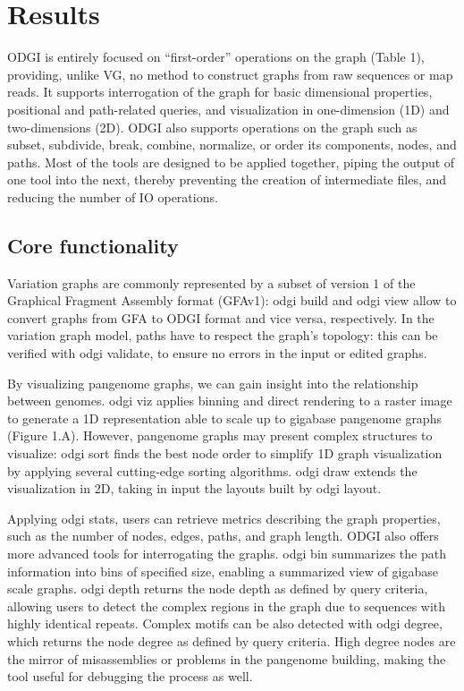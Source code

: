 \documentclass{bioinfo}
\begin{document}
\section{Results}

ODGI is entirely focused on “first-order” operations on the graph (Table 1), providing, unlike VG, no method to construct graphs from raw sequences or map reads. It supports interrogation of the graph for basic dimensional properties, positional and path-related queries, and visualization in one-dimension (1D) and two-dimensions (2D). ODGI also supports operations on the graph such as subset, subdivide, break, combine, normalize, or order its components, nodes, and paths. Most of the tools are designed to be applied together, piping the output of one tool into the next, thereby preventing the creation of intermediate files, and reducing the number of IO operations.

\subsection{Core functionality}

Variation graphs are commonly represented by a subset of version 1 of the Graphical Fragment Assembly format (GFAv1): odgi build and odgi view allow to convert graphs from GFA to ODGI format and vice versa, respectively.
In the variation graph model, paths have to respect the graph’s topology: this can be verified with odgi validate, to ensure no errors in the input or edited graphs.

By visualizing pangenome graphs, we can gain insight into the relationship between genomes. odgi viz applies binning and direct rendering to a raster image to generate a 1D representation able to scale up to gigabase pangenome graphs (Figure 1.A). However, pangenome graphs may present complex structures to visualize: odgi sort finds the best node order to simplify 1D graph visualization by applying several cutting-edge sorting algorithms. odgi draw extends the visualization in 2D, taking in input the layouts built by odgi layout.

Applying odgi stats, users can retrieve metrics describing the graph properties, such as the number of nodes, edges, paths, and graph length. ODGI also offers more advanced tools for interrogating the graphs. odgi bin summarizes the path information into bins of specified size, enabling a summarized view of gigabase scale graphs. odgi depth returns the node depth as defined by query criteria, allowing users to detect the complex regions in the graph due to sequences with highly identical repeats. Complex motifs can be also detected with odgi degree, which returns the node degree as defined by query criteria. High degree nodes are the mirror of misassemblies or problems in the pangenome building, making the tool useful for debugging the process as well.
\end{document}
